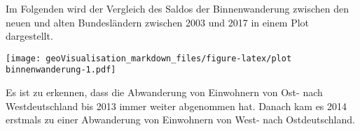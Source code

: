 \documentclass[]{article}
\begin{document}
Im Folgenden wird der Vergleich des Saldos der Binnenwanderung zwischen
den neuen und alten Bundesländern zwischen 2003 und 2017 in einem Plot
dargestellt.

\texttt{[image: geoVisualisation\_markdown\_files/figure-latex/plot binnenwanderung-1.pdf]}

Es ist zu erkennen, dass die Abwanderung von Einwohnern von Ost- nach
Westdeutschland bis 2013 immer weiter abgenommen hat. Danach kam es 2014
erstmals zu einer Abwanderung von Einwohnern von West- nach
Ostdeutschland.
\end{document}
